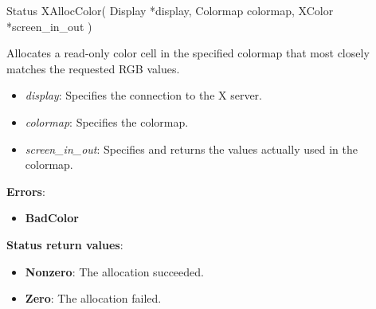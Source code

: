 \documentclass{report}
\begin{document}
\begin{itemize}
            \begin{cppcode}
                Status XAllocColor(
                    Display *display,
                    Colormap colormap,
                    XColor *screen_in_out
                )
            \end{cppcode}
            \bigbreak \noindent
            Allocates a read-only color cell in the specified colormap that most closely matches the requested RGB values.
            \begin{itemize}
                \item \textit{display}: Specifies the connection to the X server.
                \item \textit{colormap}: Specifies the colormap.
                \item \textit{screen\_in\_out}: Specifies and returns the values actually used in the colormap.
            \end{itemize}
            \bigbreak \noindent
            \textbf{Errors}:
            \begin{itemize}
                \item \textbf{BadColor}
            \end{itemize}
            \bigbreak \noindent
            \textbf{Status return values}:
            \begin{itemize}
                \item \textbf{Nonzero}: The allocation succeeded.
                \item \textbf{Zero}: The allocation failed.
            \end{itemize}


\end{itemize}
\end{document}

